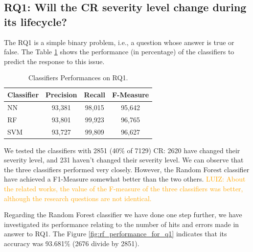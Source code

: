 \documentclass[10pt, conference]{IEEEtran}
\newcommand{\luiz}[1]{\noindent\textcolor{orange}{LUIZ: {#1}}}
\newcommand{\luiz}[1]{}
\begin{document}
\subsection{RQ1: Will the CR severity level change during its lifecycle?}

The RQ1 is a simple binary problem, i.e., a question whose answer is true or false. The Table \ref{tab:metrics_for_rq1} shows the performance (in percentage) of the classifiers to predict the response to this issue.


\begin{table}[!ht]
	\renewcommand{\arraystretch}{1.3}
	\caption{Classifiers Performances on RQ1.}
	\label{tab:metrics_for_rq1}
	\centering
	\begin{tabular}{|l|c|c|c|}
		\hline
		Classifier & Precision & Recall & F-Measure\\
		\hline 
		NN & 93,381 & 98,015 & 95,642\\
		\hline
		RF & 93,801 & 99,923 & 96,765\\
        \hline
		SVM & 93,727 & 99,809 & 96,627 \\
		\hline
		
	\end{tabular}
\end{table}

We tested the classifiers with 2851 (40\% of 7129) CR: 2620 have changed their severity level, and 231 haven't changed their severity level. We can observe that the three classifiers performed very closely. However, the Random Forest classifier have achieved a F1-Measure somewhat better than the two others. \luiz{About the related works, the value of the F-measure of the three classifiers was better, although the research questions are not identical.}

Regarding the Random Forest classifier we have done one step further, we have investigated its performance relating to the number of hits and errors made in answer to RQ1. The Figure \ref{fig:rf_performance_for_q1} indicates that its accuracy was 93.681\% (2676 divide by 2851). 
\end{document}
